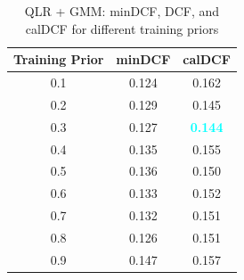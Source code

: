 \documentclass[12pt]{report}
\begin{document}
\begin{table}[H]
    \centering
    \begin{tabular}{|c|c|c|}
        \hline
        \rowcolor{blue!10}
        \textbf{Training Prior} & \textbf{minDCF} & \textbf{calDCF}                  \\
        \hline
        0.1                     & 0.124           & 0.162                            \\
        \hline
        0.2                     & 0.129           & 0.145                            \\
        \hline
        0.3                     & 0.127           & \textcolor{cyan}{\textbf{0.144}} \\
        \hline
        0.4                     & 0.135           & 0.155                            \\
        \hline
        0.5                     & 0.136           & 0.150                            \\
        \hline
        0.6                     & 0.133           & 0.152                            \\
        \hline
        0.7                     & 0.132           & 0.151                            \\
        \hline
        0.8                     & 0.126           & 0.151                            \\
        \hline
        0.9                     & 0.147           & 0.157                            \\
        \hline
    \end{tabular}
    \caption{QLR + GMM: minDCF, DCF, and calDCF for different training priors}
    \label{tab:QLR_GMM_Priors}
\end{table}
\end{document}
